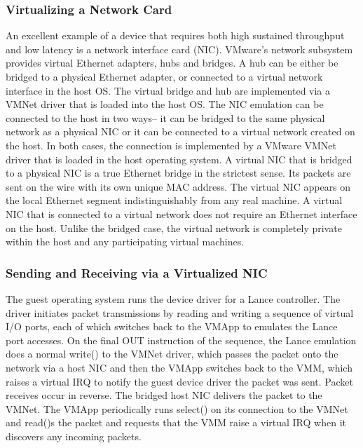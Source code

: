 \documentclass[runningheads]{llncs}
\begin{document}
\subsubsection{Virtualizing a Network Card}
An excellent example of a device that requires both high sustained throughput and low latency is a network interface card (NIC). VMware’s network subsystem provides virtual Ethernet adapters, hubs and bridges. A hub can be either be bridged to a physical Ethernet adapter, or connected to a virtual network interface in the host OS. The virtual bridge and hub are implemented via a VMNet driver that is loaded into the host OS. The NIC emulation can be connected to the host in two ways– it can be bridged to the same physical network as a physical NIC or it can be connected to a virtual network created on the host. In both cases, the connection is implemented by a VMware VMNet driver that is loaded in the host operating system. A virtual NIC that is bridged to a physical NIC is a true Ethernet bridge in the strictest sense. Its packets are sent on the wire with its own unique MAC address. The virtual NIC appears on the local Ethernet segment indistinguishably from any real machine. A virtual NIC that is connected to a virtual network does not require an Ethernet interface on the host. Unlike the bridged case, the virtual network is completely private within the host and any participating virtual machines. 

\subsubsection{Sending and Receiving via a Virtualized NIC}
The guest operating system runs the device driver for a Lance controller. The driver initiates packet transmissions by reading and writing a sequence of virtual I/O ports, each of which switches back to the VMApp to emulates the Lance port accesses. On the final OUT instruction of the sequence, the Lance emulation does a normal write() to the VMNet driver, which passes the packet onto the network via a host NIC and then the VMApp switches back to the VMM, which raises a virtual IRQ to notify the guest device driver the packet was sent. Packet receives occur in reverse. The bridged host NIC delivers the packet to the VMNet. The VMApp periodically runs select() on its connection to the VMNet and read()s the packet and requests that the VMM raise a virtual IRQ when it discovers any incoming packets.
\end{document}
